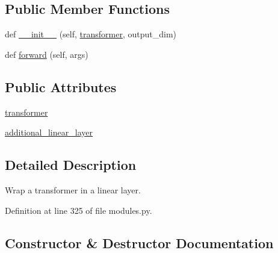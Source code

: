 \subsection*{Public Member Functions}
\begin{DoxyCompactItemize}
\item 
def \hyperlink{classparlai_1_1agents_1_1transformer_1_1modules_1_1TransformerLinearWrapper_a2676a49582292330a7829e235a7cf8f5}{\+\_\+\+\_\+init\+\_\+\+\_\+} (self, \hyperlink{classparlai_1_1agents_1_1transformer_1_1modules_1_1TransformerLinearWrapper_acac2d2f099f07b21f792326f90541ffd}{transformer}, output\+\_\+dim)
\item 
def \hyperlink{classparlai_1_1agents_1_1transformer_1_1modules_1_1TransformerLinearWrapper_a82f571e85719bde36f8fcf09f27d3e4c}{forward} (self, args)
\end{DoxyCompactItemize}
\subsection*{Public Attributes}
\begin{DoxyCompactItemize}
\item 
\hyperlink{classparlai_1_1agents_1_1transformer_1_1modules_1_1TransformerLinearWrapper_acac2d2f099f07b21f792326f90541ffd}{transformer}
\item 
\hyperlink{classparlai_1_1agents_1_1transformer_1_1modules_1_1TransformerLinearWrapper_af083195926e1f091010ecb4c6d409a2a}{additional\+\_\+linear\+\_\+layer}
\end{DoxyCompactItemize}


\subsection{Detailed Description}
\begin{DoxyVerb}Wrap a transformer in a linear layer.
\end{DoxyVerb}
 

Definition at line 325 of file modules.\+py.



\subsection{Constructor \& Destructor Documentation}
\mbox{\label{classparlai_1_1agents_1_1transformer_1_1modules_1_1TransformerLinearWrapper_a2676a49582292330a7829e235a7cf8f5}} 
